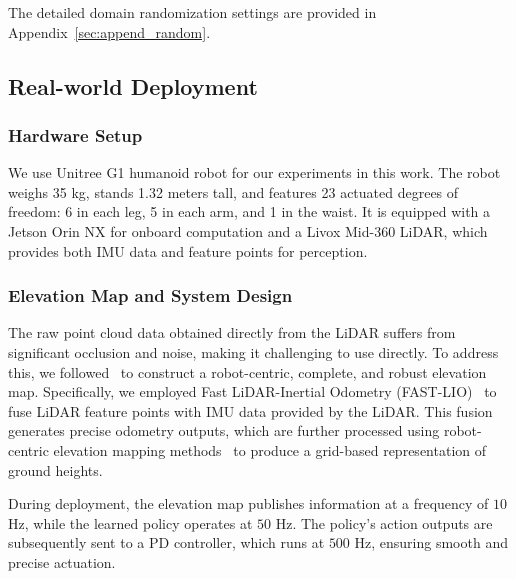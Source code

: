 The detailed domain randomization settings are provided in Appendix~\ref{sec:append_random}.

\subsection{Real-world Deployment}

\subsubsection{Hardware Setup}

We use Unitree G1 humanoid robot for our experiments in this work. The robot weighs 35 kg, stands 1.32 meters tall, and features 23 actuated degrees of freedom: 6 in each leg, 5 in each arm, and 1 in the waist. It is equipped with a Jetson Orin NX for onboard computation and a Livox Mid-360 LiDAR, which provides both IMU data and feature points for perception.

\subsubsection{Elevation Map and System Design}

The raw point cloud data obtained directly from the LiDAR suffers from significant occlusion and noise, making it challenging to use directly. To address this, we followed~\cite{long2024learninghumanoid} to construct a robot-centric, complete, and robust elevation map. Specifically, we employed Fast LiDAR-Inertial Odometry (FAST-LIO)~\cite{xu2021fast, xu2022fast} to fuse LiDAR feature points with IMU data provided by the LiDAR. This fusion generates precise odometry outputs, which are further processed using robot-centric elevation mapping methods~\cite{Fankhauser2014RobotCentricElevationMapping, Fankhauser2018ProbabilisticTerrainMapping} to produce a grid-based representation of ground heights.

During deployment, the elevation map publishes information at a frequency of $10$ Hz, while the learned policy operates at $50$ Hz. The policy’s action outputs are subsequently sent to a PD controller, which runs at $500$ Hz, ensuring smooth and precise actuation.
